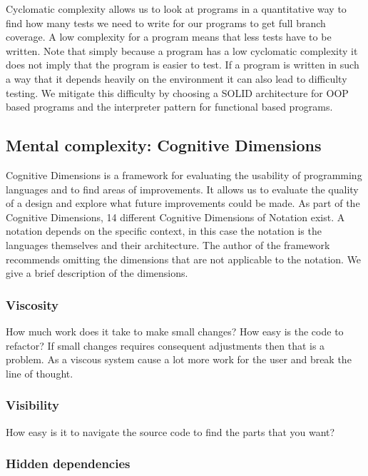\documentclass[12pt]{report}
\theoremstyle{definition}
\theoremstyle{theorem}
\begin{document}
Cyclomatic complexity allows us to look at programs in a quantitative way to
find how many tests we need to write for our programs to get full branch
coverage. A low complexity for a program means that less tests have to be
written.  Note that simply because a program has a low cyclomatic complexity it
does not imply that the program is easier to test. If a program is written in
such a way that it depends heavily on the environment it can also lead to
difficulty testing. We mitigate this difficulty by choosing a SOLID architecture
for OOP based programs and the interpreter pattern for functional based
programs.

\subsection{Mental complexity: Cognitive Dimensions}\label{cognitivedimensions}

Cognitive Dimensions is a framework for evaluating the usability of programming
languages and to find areas of improvements. It allows us to evaluate the
quality of a design and explore what future improvements could be made. As part
of the Cognitive Dimensions, 14 different Cognitive Dimensions of Notation
exist. A notation depends on the specific context, in this case the notation is
the languages themselves and their architecture. The author of the framework
recommends omitting the dimensions that are not applicable to the notation. We
give a brief description of the dimensions.

\subsubsection*{Viscosity}

How much work does it take to make small changes? How easy is the code to
refactor? If small changes requires consequent adjustments then that is a
problem. As a viscous system cause a lot more work for the user and break the
line of thought.

\subsubsection*{Visibility}

How easy is it to navigate the source code to find the parts that you want?

\subsubsection*{Hidden dependencies}
\end{document}
